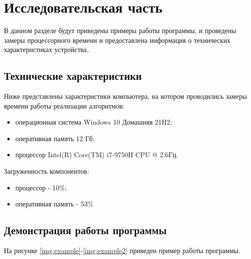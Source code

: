 \chapter{Исследовательская часть}

В данном разделе будут приведены примеры работы программы, и проведены замеры процессорного времени и предоставлена информация о технических характеристиках устройства..

\section{Технические характеристики}

Ниже представлены характеристики компьютера, на котором проводились замеры времени  работы реализации алгоритмов:

\begin{itemize}
	\item операционная система Windows 10 Домашняя 21H2;
	\item оперативная память 12 Гб;
	\item процессор Intel(R) Core(TM) i7-9750H CPU @ 2.6Гц.
\end{itemize}

Загруженность компонентов:

\begin{itemize}
	\item процессор - 10\%;
	\item оперативная память - 53\%
\end{itemize}

\clearpage

\section{Демонстрация работы программы}

На рисунке \ref{img:example}-\ref{img:example2} приведен пример работы программы.

